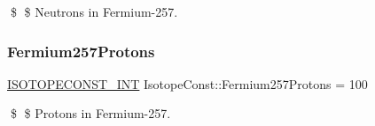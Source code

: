 \$ \$ Neutrons in Fermium-\/257. \mbox{\label{group___isotope_const-_fermium-_fm257_ga04c9726f5666e51af038bf36684039b3}} 
\subsubsection{\texorpdfstring{Fermium257\+Protons}{Fermium257Protons}}
{\footnotesize\ttfamily \mbox{\hyperlink{group___isotope_const-_macros_ga5f18360b3e99483a35c32d789e62621c}{I\+S\+O\+T\+O\+P\+E\+C\+O\+N\+S\+T\+\_\+\+I\+NT}} Isotope\+Const\+::\+Fermium257\+Protons = 100}

\$ \$ Protons in Fermium-\/257. 
